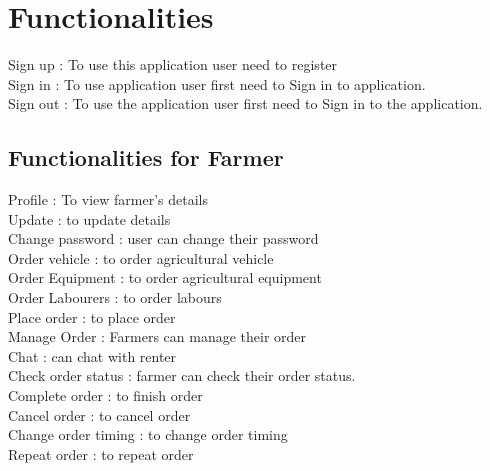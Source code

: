 \documentclass[conference]{IEEEtran}
\begin{document}
\section{Functionalities}
Sign up : To use this application user need to register\\
Sign in : To use application user first need to Sign in to application.\\
Sign out :  To use the application user first need to Sign in to the application.\\
\subsection{Functionalities for Farmer}
Profile : To view farmer's details\\
Update : to update details\\
Change password : user can change their password\\
Order vehicle : to order agricultural vehicle\\
Order Equipment : to order agricultural equipment\\
Order Labourers : to order labours\\
Place order : to place order\\
Manage Order : Farmers can manage their order\\
Chat : can chat with renter\\
Check order status : farmer can check their order status.\\
Complete order : to finish order\\
Cancel order : to cancel order\\
Change order timing : to change order timing\\
Repeat order : to repeat order\\
\end{document}

